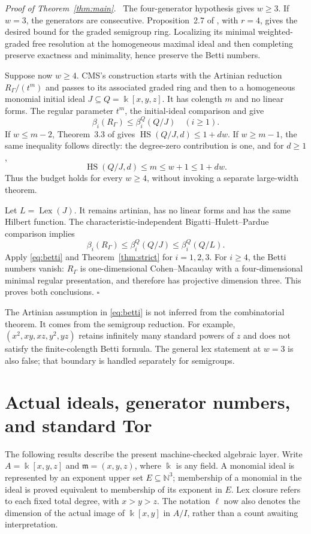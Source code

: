\documentclass[11pt,a4paper]{article}
\newenvironment{proof}[1][Proof]{\par\noindent\textit{#1.}\ \ignorespaces}{\unskip\nobreak\hfill\ensuremath{\square}\par}
\newcommand{\NN}{\mathbb N}
\newcommand{\kk}{\Bbbk}
\newcommand{\HS}{\operatorname{HS}}
\newcommand{\Lex}{\operatorname{Lex}}
\begin{document}
\begin{proof}[Proof of Theorem~\ref{thm:main}]
The four-generator hypothesis gives $w\ge3$. If $w=3$, the generators are consecutive. Proposition~2.7 of \cite{HS}, with $r=4$, gives the desired bound for the graded semigroup ring. Localizing its minimal weighted-graded free resolution at the homogeneous maximal ideal and then completing preserve exactness and minimality, hence preserve the Betti numbers.

Suppose now $w\ge4$. CMS's construction starts with the Artinian reduction $R_\Gamma/(t^m)$ and passes to its associated graded ring and then to a homogeneous monomial initial ideal $J\subseteq Q=\kk[x,y,z]$. It has colength $m$ and no linear forms. The regular parameter $t^m$, the initial-ideal comparison and \cite[equation~(1)]{CMS} give
\[
 \beta_i(R_\Gamma)\le\beta_i^Q(Q/J)\quad(i\ge1).
\]
If $w\le m-2$, Theorem~3.3 of \cite{CMS} gives $\HS(Q/J,d)\le1+dw$. If $w\ge m-1$, the same inequality follows directly: the degree-zero contribution is one, and for $d\ge1$,
\[
 \HS(Q/J,d)\le m\le w+1\le1+dw.
\]
Thus the budget holds for every $w\ge4$, without invoking a separate large-width theorem.

Let $L=\Lex(J)$. It remains artinian, has no linear forms and has the same Hilbert function. The characteristic-independent Bigatti--Hulett--Pardue comparison \cite[Theorem~2.1]{CMS} implies
\[
 \beta_i(R_\Gamma)\le\beta_i^Q(Q/J)\le\beta_i^Q(Q/L).
\]
Apply \eqref{eq:betti} and Theorem~\ref{thm:strict} for $i=1,2,3$. For $i\ge4$, the Betti numbers vanish: $R_\Gamma$ is one-dimensional Cohen--Macaulay with a four-dimensional minimal regular presentation, and therefore has projective dimension three. This proves both conclusions.
\end{proof}

The Artinian assumption in \eqref{eq:betti} is not inferred from the combinatorial theorem. It comes from the semigroup reduction. For example, $(x^2,xy,xz,y^2,yz)$ retains infinitely many standard powers of $z$ and does not satisfy the finite-colength Betti formula. The general lex statement at $w=3$ is also false; that boundary is handled separately for semigroups.


\section{Actual ideals, generator numbers, and standard Tor}\label{sec:actual}
The following results describe the present machine-checked algebraic layer.
Write $A=\kk[x,y,z]$ and $\mathfrak m=(x,y,z)$, where $\kk$ is any field.
A monomial ideal is represented by an exponent upper set $E\subseteq\NN^3$;
membership of a monomial in the ideal is proved equivalent to membership of its
exponent in $E$. Lex closure refers to each fixed total degree, with $x>y>z$.
The notation $\ell$ now also denotes the dimension of the actual image of
$\kk[x,y]$ in $A/I$, rather than a count awaiting interpretation.
\end{document}
